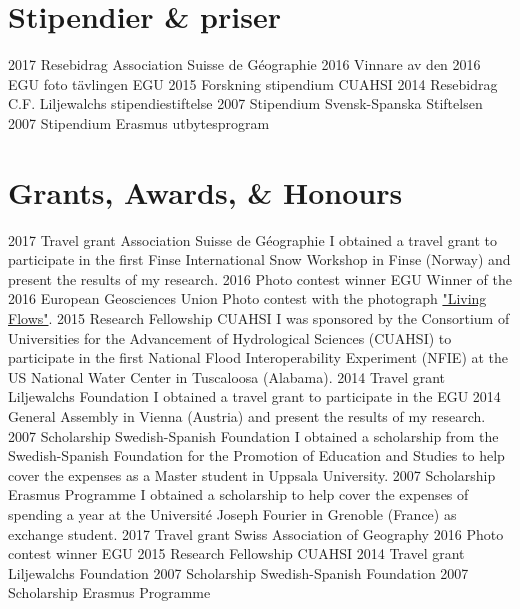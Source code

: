\ifswedish
    \section{Stipendier \& priser}
    \shortposition
        {2017}
        {Resebidrag}
        {Association Suisse de Géographie}
    \shortposition
        {2016}
        {Vinnare av den 2016 EGU foto tävlingen}
        {EGU}
    \shortposition
        {2015}
        {Forskning stipendium}
        {CUAHSI}
    \shortposition
        {2014}
        {Resebidrag}
        {C.F. Liljewalchs stipendiestiftelse}
    \shortposition
        {2007}
        {Stipendium}
        {Svensk-Spanska Stiftelsen}
    \shortposition
        {2007}
        {Stipendium}
        {Erasmus utbytesprogram}
\else
    \section{Grants, Awards, \& Honours}
    \ifacademic
    \position
        {2017}
        {Travel grant}
        {Association Suisse de Géographie}
        {I obtained a travel grant to participate in the first Finse International Snow Workshop in Finse (Norway) and present the results of my research.}
    \position
        {2016}
        {Photo contest winner}
        {EGU}
        {Winner of the 2016 European Geosciences Union Photo contest with the photograph \href{https://blogs.egu.eu/geolog/2016/08/29/imaggeo-on-mondays-living-flows/}{"Living Flows"}.}
    \position
        {2015}
        {Research Fellowship}
        {CUAHSI}
        {I was sponsored by the Consortium of Universities for the Advancement of Hydrological Sciences (CUAHSI) to participate in the first National Flood Interoperability Experiment (NFIE) at the US National Water Center in Tuscaloosa (Alabama).}
    \position
        {2014}
        {Travel grant}
        {Liljewalchs Foundation}
        {I obtained a travel grant to participate in the EGU 2014 General Assembly in Vienna (Austria) and present the results of my research.}
    \position
        {2007}
        {Scholarship}
        {Swedish-Spanish Foundation}
        {I obtained a scholarship from the Swedish-Spanish Foundation for the Promotion of Education and Studies to help cover the expenses as a Master student in Uppsala University.}
    \position
        {2007}
        {Scholarship}
        {Erasmus Programme}
        {I obtained a scholarship to help cover the expenses of spending a year at the Université Joseph Fourier in Grenoble (France) as exchange student.}
    \else
    \shortposition
        {2017}
        {Travel grant}
        {Swiss Association of Geography}
    \shortposition
        {2016}
        {Photo contest winner}
        {EGU}
    \shortposition
        {2015}
        {Research Fellowship}
        {CUAHSI}
    \shortposition
        {2014}
        {Travel grant}
        {Liljewalchs Foundation}
    \shortposition
        {2007}
        {Scholarship}
        {Swedish-Spanish Foundation}
    \shortposition
        {2007}
        {Scholarship}
        {Erasmus Programme}
    \fi
\fi
